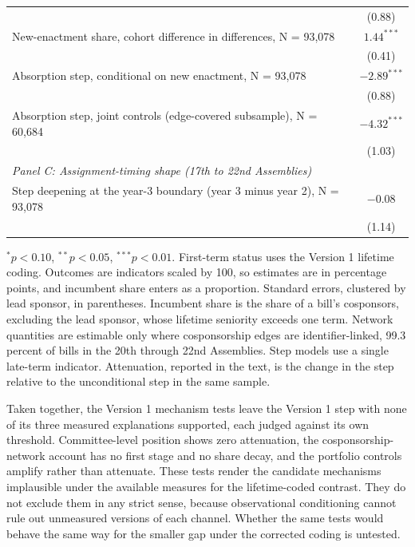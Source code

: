 \documentclass[11pt]{article}
\begin{document}
\begin{table}[H]
\begin{tabular}{lc}
& (0.88) \\
New-enactment share, cohort difference in differences, N = 93,078 & $1.44^{***}$ \\
& (0.41) \\
Absorption step, conditional on new enactment, N = 93,078 & $-2.89^{***}$ \\
& (0.88) \\
Absorption step, joint controls (edge-covered subsample), N = 60,684 & $-4.32^{***}$ \\
& (1.03) \\
\midrule
\multicolumn{2}{l}{\textit{Panel C: Assignment-timing shape (17th to 22nd Assemblies)}} \\
Step deepening at the year-3 boundary (year 3 minus year 2), N = 93,078 & $-0.08$ \\
& (1.14) \\
\bottomrule
\end{tabular}

\smallskip
\begin{minipage}{0.95\textwidth}
\footnotesize $^{*}p<0.10$, $^{**}p<0.05$, $^{***}p<0.01$. First-term status uses the Version 1 lifetime coding. Outcomes are indicators scaled by 100, so estimates are in percentage points, and incumbent share enters as a proportion. Standard errors, clustered by lead sponsor, in parentheses. Incumbent share is the share of a bill's cosponsors, excluding the lead sponsor, whose lifetime seniority exceeds one term. Network quantities are estimable only where cosponsorship edges are identifier-linked, 99.3 percent of bills in the 20th through 22nd Assemblies. Step models use a single late-term indicator. Attenuation, reported in the text, is the change in the step relative to the unconditional step in the same sample.
\end{minipage}
\end{table}

Taken together, the Version 1 mechanism tests leave the Version 1 step with none of its three measured explanations supported, each judged against its own threshold. Committee-level position shows zero attenuation, the cosponsorship-network account has no first stage and no share decay, and the portfolio controls amplify rather than attenuate. These tests render the candidate mechanisms implausible under the available measures for the lifetime-coded contrast. They do not exclude them in any strict sense, because observational conditioning cannot rule out unmeasured versions of each channel. Whether the same tests would behave the same way for the smaller gap under the corrected coding is untested.
\end{document}
